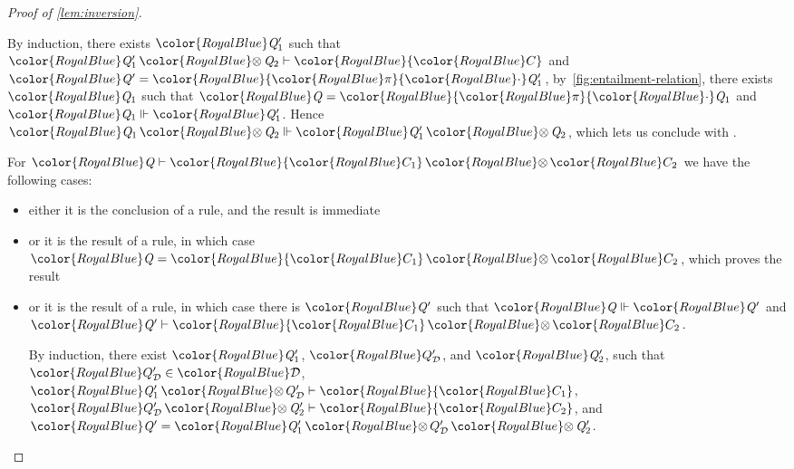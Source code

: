 \documentclass[acmsmall,usenames,dvipsnames,natbib=false,acmthm=false,screen]{acmart}
\newcommand{\constraintcolour}{\color{RoyalBlue}}
\newcommand{\constraintfont}[1]{{\constraintcolour#1}}
\newcommand{\multiplicitycolour}{\color{RoyalBlue}}
\newcommand{\multiplicityfont}[1]{{\multiplicitycolour#1}}
\newcommand{\scale}{\constraintfont{\cdot}}
\newcommand{\constraintop}[1]{\mathop{\constraintfont{#1}}}
\newcommand{\qtensor}{\constraintop{\otimes}}
\theoremstyle{acmplain}
\theoremstyle{acmdefinition}
\begin{document}
\begin{proof}[Proof of \cref{lem:inversion}]
\begin{itemize}
\begin{itemize}
      By induction, there exists $  \constraintfont{ \ottnt{Q'_{{\mathrm{1}}}} }  $ such that $ \constraintfont{ \ottnt{Q'_{{\mathrm{1}}}}  \qtensor  \ottnt{Q_{{\mathrm{2}}}} }   \vdash   \constraintfont{ \constraintfont{C} } $ and $  \constraintfont{ \ottnt{Q'} }   =   \constraintfont{   \multiplicityfont{ \pi }  \scale \ottnt{Q'_{{\mathrm{1}}}}  }  $,
      by~\cref{fig:entailment-relation}, there exists $  \constraintfont{ \ottnt{Q_{{\mathrm{1}}}} }  $ such
      that $  \constraintfont{ \ottnt{Q} }   =   \constraintfont{   \multiplicityfont{ \pi }  \scale \ottnt{Q_{{\mathrm{1}}}}  }  $ and $ \constraintfont{ \ottnt{Q_{{\mathrm{1}}}} }   \Vdash   \constraintfont{ \ottnt{Q'_{{\mathrm{1}}}} } $. Hence $ \constraintfont{ \ottnt{Q_{{\mathrm{1}}}}  \qtensor  \ottnt{Q_{{\mathrm{2}}}} }   \Vdash   \constraintfont{ \ottnt{Q'_{{\mathrm{1}}}}  \qtensor  \ottnt{Q_{{\mathrm{2}}}} } $, which lets us conclude with .
    \end{itemize}
  \end{itemize}

  For $ \constraintfont{ \ottnt{Q} }   \vdash   \constraintfont{ \constraintfont{C_{{\mathrm{1}}}}  \qtensor  \constraintfont{C_{{\mathrm{2}}}} } $ we have the following cases:
  \begin{itemize}
  \item either it is the conclusion of a  rule, and
    the result is immediate
  \item or it is the result of a  rule, in which case
    $  \constraintfont{ \ottnt{Q} }   =   \constraintfont{ \constraintfont{C_{{\mathrm{1}}}}  \qtensor  \constraintfont{C_{{\mathrm{2}}}} }  $, which proves the result
  \item or it is the result of a  rule, in which case
    there is $  \constraintfont{ \ottnt{Q'} }  $ such that $ \constraintfont{ \ottnt{Q} }   \Vdash   \constraintfont{ \ottnt{Q'} } $ and $ \constraintfont{ \ottnt{Q'} }   \vdash   \constraintfont{ \constraintfont{C_{{\mathrm{1}}}}  \qtensor  \constraintfont{C_{{\mathrm{2}}}} } $.

    By induction, there exist $  \constraintfont{ \ottnt{Q'_{{\mathrm{1}}}} }  $, $  \constraintfont{ Q_{\mathcal{D} }' }  $, and
    $  \constraintfont{ \ottnt{Q'_{{\mathrm{2}}}} }  $, such that $  \constraintfont{ Q_{\mathcal{D} }' }   \in  \constraintfont{\mathcal{D} } $, $ \constraintfont{ \ottnt{Q'_{{\mathrm{1}}}}  \qtensor  Q_{\mathcal{D} }' }   \vdash   \constraintfont{ \constraintfont{C_{{\mathrm{1}}}} } $,
    $ \constraintfont{ Q_{\mathcal{D} }'  \qtensor  \ottnt{Q'_{{\mathrm{2}}}} }   \vdash   \constraintfont{ \constraintfont{C_{{\mathrm{2}}}} } $, and $  \constraintfont{ \ottnt{Q'} }   =   \constraintfont{ \ottnt{Q'_{{\mathrm{1}}}}  \qtensor  Q_{\mathcal{D} }'  \qtensor  \ottnt{Q'_{{\mathrm{2}}}} }  $.


\end{itemize}
\end{proof}
\end{document}
